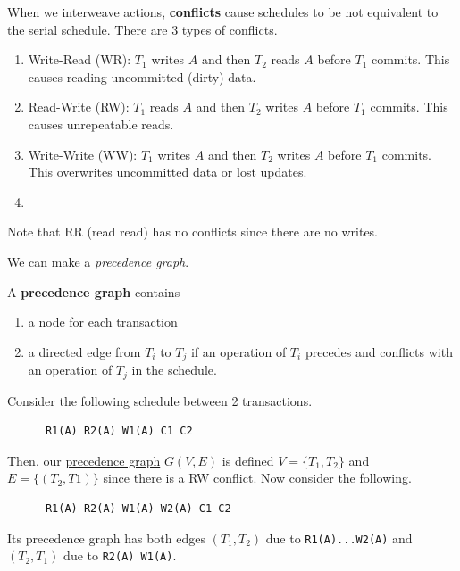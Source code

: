   \begin{definition}[Conflict]
    \label{def:conflict}
    When we interweave actions, \textbf{conflicts} cause schedules to be not equivalent to the serial schedule. There are 3 types of conflicts. 
    \begin{enumerate}
      \item Write-Read (WR): $T_1$ writes $A$ and then $T_2$ reads $A$ before $T_1$ commits. This causes reading uncommitted (dirty) data. 
      \item Read-Write (RW): $T_1$ reads $A$ and then $T_2$ writes $A$ before $T_1$ commits. This causes unrepeatable reads. 
      \item Write-Write (WW): $T_1$ writes $A$ and then $T_2$ writes $A$ before $T_1$ commits. This overwrites uncommitted data or lost updates. 
      \item 
    \end{enumerate}
    Note that RR (read read) has no conflicts since there are no writes. 
  \end{definition}

  We can make a \textit{precedence graph}. 

  \begin{definition}
    \label{def:precedence-graph}
    A \textbf{precedence graph} contains 
    \begin{enumerate}
      \item a node for each transaction 
      \item a directed edge from $T_i$ to $T_j$ if an operation of $T_i$ precedes and conflicts with an operation of $T_j$ in the schedule. 
    \end{enumerate}
  \end{definition} 

  \begin{example}
    \label{ex:precedence-graph}
    Consider the following schedule between 2 transactions. 
    \begin{lstlisting}
      R1(A) R2(A) W1(A) C1 C2
    \end{lstlisting}
    Then, our \hyperref[def:precedence-graph]{precedence graph} $G(V, E)$ is defined $V = \{T_1, T_2\}$ and $E = \{(T_2, T1)\}$ since there is a RW conflict. Now consider the following. 
    \begin{lstlisting}
      R1(A) R2(A) W1(A) W2(A) C1 C2
    \end{lstlisting}
    Its precedence graph has both edges $(T_1, T_2)$ due to \texttt{R1(A)...W2(A)} and $(T_2, T_1)$ due to \texttt{R2(A) W1(A)}. 
  \end{example}

